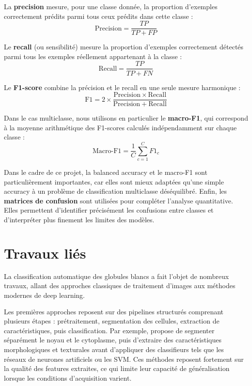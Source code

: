 \documentclass[journal,twocolumn]{IEEEtran}
\begin{document}
La \textbf{precision} mesure, pour une classe donnée, la proportion d’exemples correctement prédits parmi tous ceux prédits dans cette classe :
\begin{equation}
\mathrm{Precision} = \frac{TP}{TP + FP}
\end{equation}

Le \textbf{recall} (ou sensibilité) mesure la proportion d’exemples correctement détectés parmi tous les exemples réellement appartenant à la classe :
\begin{equation}
\mathrm{Recall} = \frac{TP}{TP + FN}
\end{equation}

Le \textbf{F1-score} combine la précision et le recall en une seule mesure harmonique :
\begin{equation}
\mathrm{F1} = 2 \times \frac{\mathrm{Precision} \times \mathrm{Recall}}{\mathrm{Precision} + \mathrm{Recall}}
\end{equation}

Dans le cas multiclasse, nous utilisons en particulier le \textbf{macro-F1}, qui correspond à la moyenne arithmétique des F1-scores calculés indépendamment sur chaque classe :
\begin{equation}
\mathrm{Macro\text{-}F1} = \frac{1}{C}\sum_{c=1}^{C} F1_c
\end{equation}

Dans le cadre de ce projet, la balanced accuracy et le macro-F1 sont particulièrement importantes, car elles sont mieux adaptées qu’une simple accuracy à un problème de classification multiclasse déséquilibré. Enfin, les \textbf{matrices de confusion} sont utilisées pour compléter l’analyse quantitative. Elles permettent d’identifier précisément les confusions entre classes et d’interpréter plus finement les limites des modèles.


\section{Travaux liés}

La classification automatique des globules blancs a fait l’objet de nombreux travaux, allant des approches classiques de traitement d’images aux méthodes modernes de deep learning.

Les premières approches reposent sur des pipelines structurés comprenant plusieurs étapes : prétraitement, segmentation des cellules, extraction de caractéristiques, puis classification. Par exemple, \cite{REZATOFIGHI2011333} propose de segmenter séparément le noyau et le cytoplasme, puis d’extraire des caractéristiques morphologiques et texturales avant d’appliquer des classifieurs tels que les réseaux de neurones artificiels ou les SVM. Ces méthodes reposent fortement sur la qualité des features extraites, ce qui limite leur capacité de généralisation lorsque les conditions d’acquisition varient.
\end{document}
